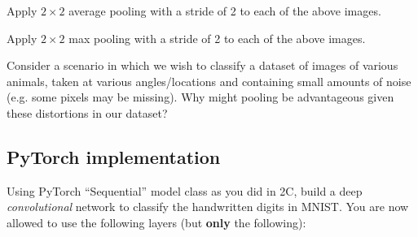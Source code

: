 Apply $2 \times 2$ average pooling with a stride of 2 to each of the above images.

\begin{subsolution}

\end{subsolution}

\newpage


\problem[3]

Apply $2 \times 2$ max pooling with a stride of 2 to each of the above images.

\begin{subsolution}

\end{subsolution}

\newpage


\problem[4]

Consider a scenario in which we wish to classify a dataset of images of various animals, taken at various angles/locations and containing small amounts of noise (e.g. some pixels may be missing). Why might pooling be advantageous given these distortions in our dataset?

\begin{subsolution}

\end{subsolution}

\newpage


\subsection{PyTorch implementation}
\problem[20]

Using PyTorch ``Sequential'' model class as you did in 2C, build a deep \emph{convolutional}
network to classify the handwritten digits in MNIST. You are now allowed to use
the following layers (but \textbf{only} the following):

